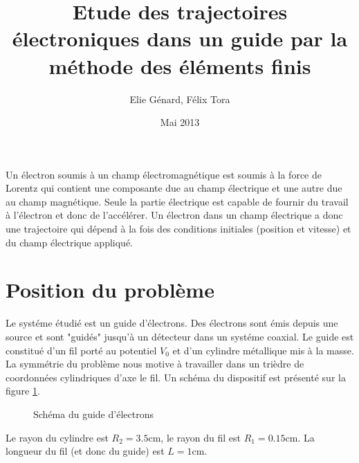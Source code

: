 \documentclass[a4paper,12pt]{article}
\title{Etude des trajectoires électroniques dans un guide par la méthode des éléments finis}
\author{Elie Génard, Félix Tora}
\date{Mai 2013}
\begin{document}
\maketitle

Un électron soumis à un champ électromagnétique est soumis à la force de Lorentz qui contient une composante due au champ électrique et une autre due au champ magnétique. Seule la partie électrique est capable de fournir du travail à l'électron et donc de l'accélérer. Un électron dans un champ électrique a donc une trajectoire qui dépend à la fois des conditions initiales (position et vitesse) et du champ électrique appliqué.

\section{Position du problème}

Le systéme étudié est un guide d'électrons. Des électrons sont émis depuis une source et sont "guidés" jusqu'à un détecteur dans un systéme coaxial. Le guide est constitué d'un fil porté au potentiel $V_0$ et d'un cylindre métallique mis à la masse. La symmétrie du problème nous motive à travailler dans un trièdre de coordonnées cylindriques d'axe le fil. Un schéma du dispositif est présenté sur la figure \ref{fig:schema}.

\begin{figure}[h]
\centering
{}
\caption{Schéma du guide d'électrons}
\label{fig:schema}
\end{figure}
Le rayon du cylindre est $R_2 = 3.5 \mathrm{cm}$, le rayon du fil est $R_1 = 0.15 \mathrm{cm}$. La longueur du fil (et donc du guide) est $L = 1 \mathrm{cm}$.
\end{document}
